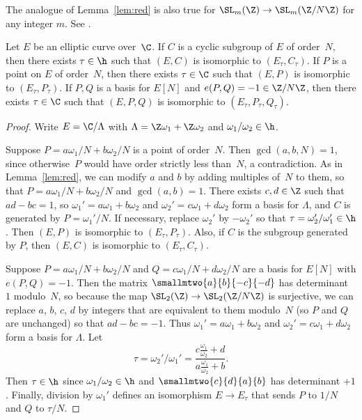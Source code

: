 \documentclass{report}
\begin{document}
\begin{remark}
The analogue of Lemma~\ref{lem:red} is also true
for $\SL_m(\Z)\to\SL_m(\Z/N\Z)$ for any integer $m$.
See \cite[?]{shimura:intro}.
\end{remark}

\begin{proposition}\label{prop:equiv_to_tau}
Let $E$ be an elliptic curve over~$\C$.  If $C$ is a cyclic
subgroup of $E$ of order~$N$, then there exists $\tau\in\h$ such
that $(E,C)$ is isomorphic to $(E_\tau, C_\tau)$.  If $P$ is a
point on $E$ of order~$N$, then there exists $\tau\in\C$ such that
$(E,P)$ is isomorphic to $(E_\tau, P_\tau)$.   If $P,Q$ is a basis
for $E[N]$ and $e(P,Q)=-1\in\Z/N\Z$, then there exists $\tau\in\C$
such that $(E,P,Q)$ is isomorphic to $(E_\tau,P_\tau,Q_\tau)$.
\end{proposition}
\begin{proof}
Write $E=\C/\Lambda$ with $\Lambda=\Z\omega_1+\Z\omega_2$ and
$\omega_1/\omega_2\in\h$.

Suppose $P=a\omega_1/N + b\omega_2/N$ is a point of order~$N$.  Then
$\gcd(a,b,N)=1$, since otherwise~$P$ would have order strictly less
than~$N$, a contradiction.  As in Lemma~\ref{lem:red}, we can modify
$a$ and $b$ by adding multiples of~$N$ to them, so that $P=a\omega_1/N
+ b\omega_2/N$ and $\gcd(a,b)=1$. There exists $c,d\in\Z$ such that
$ad-bc=1$, so $\omega_1'=a\omega_1 + b\omega_2$ and
$\omega_2'=c\omega_1+d\omega_2$ form a basis for $\Lambda$, and $C$ is
generated by $P=\omega_1'/N$.  If necessary, replace $\omega_2'$ by
$-\omega_2'$ so that $\tau=\omega_2'/\omega_1'\in\h$. Then $(E,P)$ is
isomorphic to $(E_{\tau},P_{\tau})$.  Also, if $C$ is the subgroup
generated by $P$, then $(E,C)$ is isomorphic to $(E_\tau,C_\tau)$.

Suppose $P=a\omega_1/N+b\omega_2/N$ and
$Q=c\omega_1/N+d\omega_2/N$ are a basis for $E[N]$ with
$e(P,Q)=-1$. Then the matrix $\smallmtwo{\hfill{}a}{\hfill{}b}{-c}{-d}$ has
determinant~$1$ modulo~$N$, so because the map $\SL_2(\Z)\to
\SL_2(\Z/N\Z)$ is surjective, we can replace $a$, $b$, $c$, $d$ by
integers that are equivalent to them modulo~$N$ (so $P$ and $Q$
are unchanged) so that $ad-bc=-1$. Thus
$\omega_1'=a\omega_1+b\omega_2$ and
$\omega_2'=c\omega_1+d\omega_2$ form a basis for $\Lambda$. Let
\[
\tau=\omega_2'/\omega_1'=\frac{c\frac{\omega_1}{\omega_2} +
d}{a\frac{\omega_1}{\omega_2}+b}.
\]
Then $\tau\in\h$ since $\omega_1/\omega_2\in\h$ and
$\smallmtwo{c}{d}{a}{b}$ has determinant $+1$.  Finally, division
by $\omega_1'$ defines an isomorphism $E\to E_\tau$ that sends $P$
to $1/N$ and $Q$ to $\tau/N$.
\end{proof}
\end{document}
